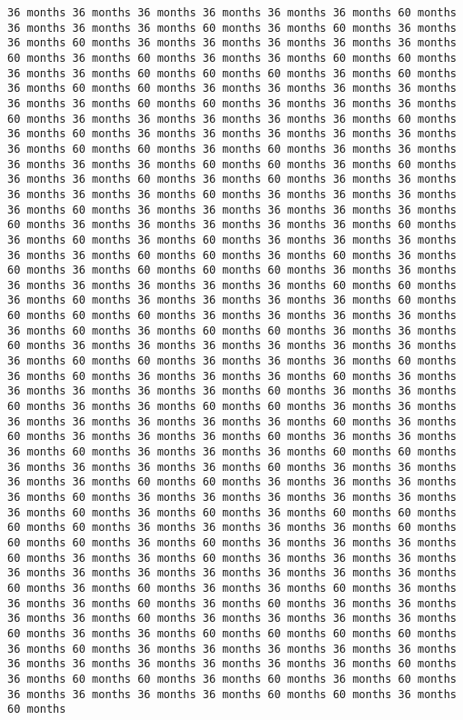 \documentclass[11pt]{article}
\begin{document}
\begin{Verbatim}[commandchars=\\\{\}, frame=single, framerule=2mm, rulecolor=\color{outerrorbackground}]
36 months 36 months 36 months 36 months 36 months 36 months 60 months 36 months 36 months 36 months 60 months 36 months 60 months 36 months 36 months 60 months 36 months 36 months 36 months 36 months 36 months 60 months 36 months 60 months 36 months 36 months 60 months 60 months 36 months 36 months 60 months 60 months 60 months 36 months 60 months 36 months 60 months 60 months 36 months 36 months 36 months 36 months 36 months 36 months 60 months 60 months 36 months 36 months 36 months 60 months 36 months 36 months 36 months 36 months 36 months 60 months 36 months 60 months 36 months 36 months 36 months 36 months 36 months 36 months 60 months 60 months 36 months 60 months 36 months 36 months 36 months 36 months 36 months 60 months 60 months 36 months 60 months 36 months 36 months 60 months 36 months 60 months 36 months 36 months 36 months 36 months 36 months 60 months 36 months 36 months 36 months 36 months 60 months 36 months 36 months 36 months 36 months 36 months 60 months 36 months 36 months 36 months 36 months 36 months 60 months 36 months 60 months 36 months 60 months 36 months 36 months 36 months 36 months 36 months 60 months 60 months 36 months 60 months 36 months 60 months 36 months 60 months 60 months 60 months 36 months 36 months 36 months 36 months 36 months 36 months 36 months 60 months 60 months 36 months 60 months 36 months 36 months 36 months 36 months 60 months 60 months 60 months 60 months 36 months 36 months 36 months 36 months 36 months 60 months 36 months 60 months 60 months 36 months 36 months 60 months 36 months 36 months 36 months 36 months 36 months 36 months 36 months 60 months 60 months 36 months 36 months 36 months 60 months 36 months 60 months 36 months 36 months 36 months 60 months 36 months 36 months 36 months 36 months 36 months 60 months 36 months 36 months 60 months 36 months 36 months 60 months 60 months 36 months 36 months 36 months 36 months 36 months 36 months 36 months 60 months 36 months 60 months 36 months 36 months 36 months 60 months 36 months 36 months 36 months 60 months 36 months 36 months 36 months 60 months 60 months 36 months 36 months 36 months 36 months 60 months 36 months 36 months 36 months 36 months 60 months 60 months 36 months 36 months 36 months 36 months 60 months 36 months 36 months 36 months 36 months 36 months 36 months 60 months 36 months 60 months 36 months 60 months 60 months 60 months 60 months 36 months 36 months 36 months 36 months 60 months 60 months 60 months 36 months 60 months 36 months 36 months 36 months 60 months 36 months 36 months 60 months 36 months 36 months 36 months 36 months 36 months 36 months 36 months 36 months 36 months 36 months 60 months 36 months 60 months 36 months 36 months 60 months 36 months 36 months 36 months 60 months 36 months 60 months 36 months 36 months 36 months 36 months 60 months 36 months 36 months 36 months 36 months 60 months 36 months 36 months 60 months 60 months 60 months 60 months 36 months 60 months 36 months 36 months 36 months 36 months 36 months 36 months 36 months 36 months 36 months 36 months 36 months 60 months 36 months 60 months 60 months 36 months 60 months 36 months 60 months 36 months 36 months 36 months 36 months 60 months 60 months 36 months 60 months 
\end{Verbatim}
\end{document}

